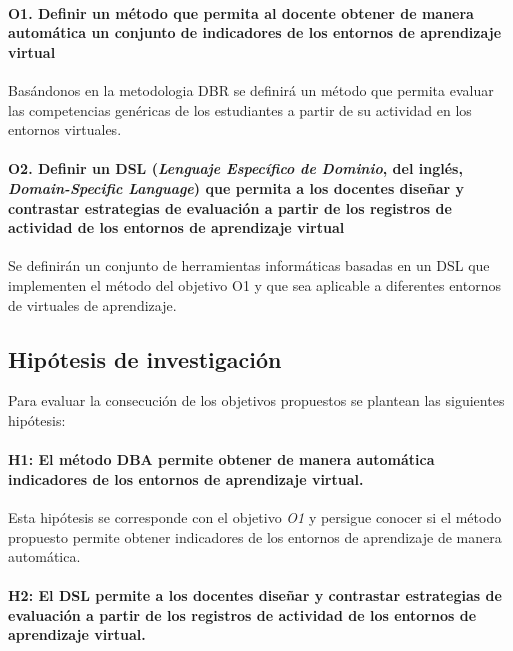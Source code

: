 \paragraph*{O1. Definir un método que permita al docente obtener de manera automática un conjunto de indicadores de los entornos de aprendizaje virtual}

Basándonos en la metodologia DBR se definirá un método que permita evaluar las competencias genéricas de los estudiantes a partir de su actividad en los entornos virtuales.

\paragraph*{O2. Definir un DSL (\emph{Lenguaje Específico de Dominio}, del inglés, \emph{Domain-Specific Language}) que permita a los docentes diseñar y contrastar estrategias de evaluación a partir de los registros de actividad de los entornos de aprendizaje virtual}

Se definirán un conjunto de herramientas informáticas basadas en un DSL que implementen el método del objetivo O1 y que sea aplicable a diferentes entornos de virtuales de aprendizaje.

\subsection{Hipótesis de investigación}

Para evaluar la consecución de los objetivos propuestos se plantean las siguientes hipótesis:

\paragraph*{H1: El método DBA permite obtener de manera automática indicadores de los entornos de aprendizaje virtual.}

Esta hipótesis se corresponde con el objetivo \emph{O1} y persigue conocer si el método propuesto permite obtener indicadores de los entornos de aprendizaje de manera automática.

\paragraph*{H2: El DSL permite a los docentes diseñar y contrastar estrategias de evaluación a partir de los registros de actividad de los entornos de aprendizaje virtual.}

